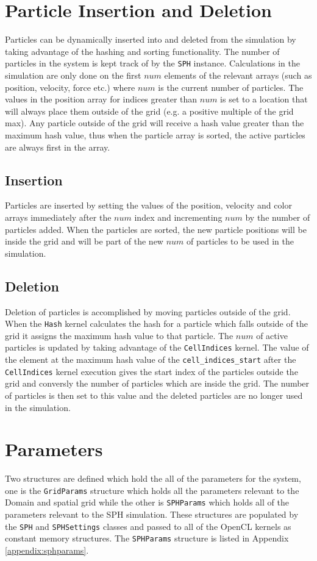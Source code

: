 \section{Particle Insertion and Deletion}
Particles can be dynamically inserted into and deleted from the simulation by
taking advantage of the hashing and sorting functionality. The number of
particles in the system is kept track of by the \verb|SPH| instance.
Calculations in the simulation are only done on the first $num$ elements of the
relevant arrays (such as position, velocity, force etc.) where $num$ is the
current number of particles. The values in the position array for indices
greater than $num$ is set to a location that will always place them outside of
the grid (e.g. a positive multiple of the grid max). Any particle outside of
the grid will receive a hash value greater than the maximum hash value, thus
when the particle array is sorted, the active particles are always first in the
array. 

\subsection{Insertion}
Particles are inserted by setting the values of the position, velocity and
color arrays immediately after the $num$ index and incrementing $num$ by the
number of particles added. When the particles are sorted, the new particle
positions will be inside the grid and will be part of the new $num$ of
particles to be used in the simulation.

\subsection{Deletion}
Deletion of particles is accomplished by moving particles outside of the grid.
When the \verb|Hash| kernel calculates the hash for a particle which falls
outside of the grid it assigns the maximum hash value to that particle.
The $num$ of active particles is updated by taking advantage of the
\verb|CellIndices| kernel. The value of the element at the maximum hash value
of the \verb|cell_indices_start| after the \verb|CellIndices| kernel execution
gives the start index of the particles outside the grid and conversly the
number of particles which are inside the grid. The number of particles is then
set to this value and the deleted particles are no longer used in the
simulation.

\section{Parameters}
Two structures are defined which hold the all of the parameters for the system,
one is the \verb|GridParams| structure which holds all the parameters relevant
to the Domain and spatial grid while the other is \verb|SPHParams| which holds
all of the parameters relevant to the SPH simulation. These structures are
populated by the \verb|SPH| and \verb|SPHSettings| classes and passed to all of
the OpenCL kernels as constant memory structures. The \verb|SPHParams|
structure is listed in Appendix \ref{appendix:sphparams}.


